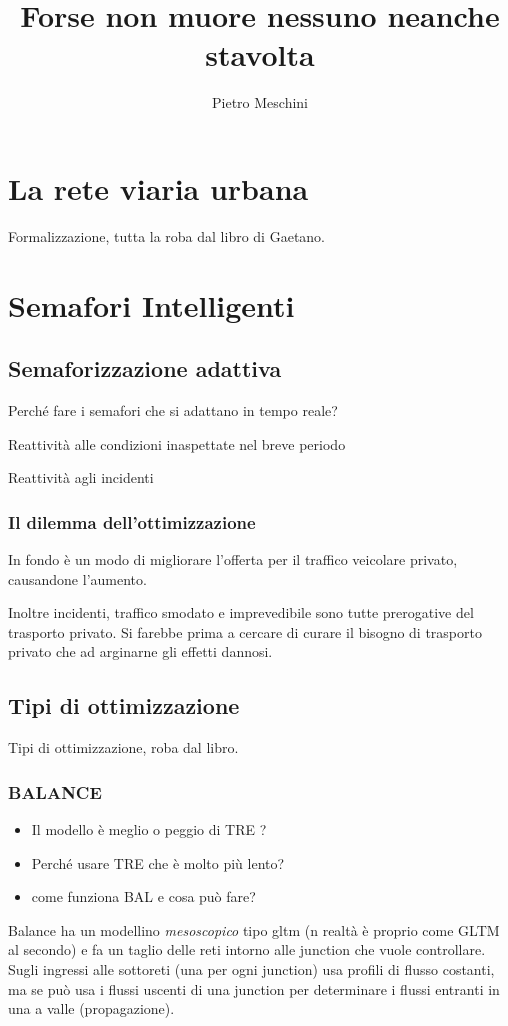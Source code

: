 \documentclass[10pt,a4paper,twoside]{book}
\author{Pietro Meschini}
\title{Forse non muore nessuno neanche stavolta}
\begin{document}
\chapter{La rete viaria urbana}
Formalizzazione, tutta la roba dal libro di Gaetano.

\chapter{Semafori Intelligenti}
\section{Semaforizzazione adattiva}
Perché fare i semafori che si adattano in tempo reale?

Reattività alle condizioni inaspettate nel breve periodo

Reattività agli incidenti

\subsection{Il dilemma dell'ottimizzazione}
In fondo è un modo di migliorare l'offerta per il traffico veicolare privato, causandone l'aumento.

Inoltre incidenti, traffico smodato e imprevedibile sono tutte prerogative del trasporto privato. Si farebbe prima a cercare di curare il bisogno di trasporto privato che ad arginarne gli effetti dannosi.

\section{Tipi di ottimizzazione}
Tipi di ottimizzazione, roba dal libro.

\subsection{BALANCE}

\begin{itemize}
\item Il modello è meglio o peggio di TRE ?
\item Perché usare TRE che è molto più lento?
\item come funziona BAL e cosa può fare?
\end{itemize}

Balance ha un modellino \emph{mesoscopico} tipo gltm (n realtà è proprio come GLTM al secondo) e fa un taglio delle reti intorno alle junction che vuole controllare. Sugli ingressi alle sottoreti (una per ogni junction) usa profili di flusso costanti, ma se può usa i flussi uscenti di una junction per determinare i flussi entranti in una a valle (propagazione).
\end{document}
